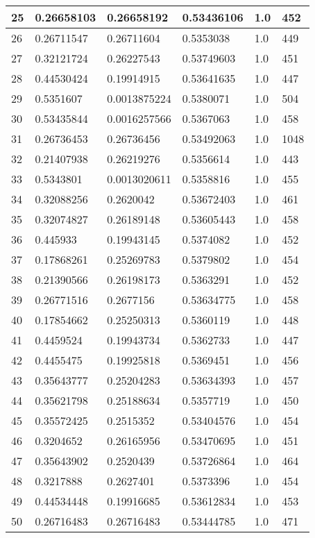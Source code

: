 \begin{longtable}{|l|l|l|l|l|l|}
25 & 0.26658103 & 0.26658192 & 0.53436106 & 1.0 & 452 \\ \hline 
26 & 0.26711547 & 0.26711604 & 0.5353038 & 1.0 & 449 \\ \hline 
27 & 0.32121724 & 0.26227543 & 0.53749603 & 1.0 & 451 \\ \hline 
28 & 0.44530424 & 0.19914915 & 0.53641635 & 1.0 & 447 \\ \hline 
29 & 0.5351607 & 0.0013875224 & 0.5380071 & 1.0 & 504 \\ \hline 
30 & 0.53435844 & 0.0016257566 & 0.5367063 & 1.0 & 458 \\ \hline 
31 & 0.26736453 & 0.26736456 & 0.53492063 & 1.0 & 1048 \\ \hline 
32 & 0.21407938 & 0.26219276 & 0.5356614 & 1.0 & 443 \\ \hline 
33 & 0.5343801 & 0.0013020611 & 0.5358816 & 1.0 & 455 \\ \hline 
34 & 0.32088256 & 0.2620042 & 0.53672403 & 1.0 & 461 \\ \hline 
35 & 0.32074827 & 0.26189148 & 0.53605443 & 1.0 & 458 \\ \hline 
36 & 0.445933 & 0.19943145 & 0.5374082 & 1.0 & 452 \\ \hline 
37 & 0.17868261 & 0.25269783 & 0.5379802 & 1.0 & 454 \\ \hline 
38 & 0.21390566 & 0.26198173 & 0.5363291 & 1.0 & 452 \\ \hline 
39 & 0.26771516 & 0.2677156 & 0.53634775 & 1.0 & 458 \\ \hline 
40 & 0.17854662 & 0.25250313 & 0.5360119 & 1.0 & 448 \\ \hline 
41 & 0.4459524 & 0.19943734 & 0.5362733 & 1.0 & 447 \\ \hline 
42 & 0.4455475 & 0.19925818 & 0.5369451 & 1.0 & 456 \\ \hline 
43 & 0.35643777 & 0.25204283 & 0.53634393 & 1.0 & 457 \\ \hline 
44 & 0.35621798 & 0.25188634 & 0.5357719 & 1.0 & 450 \\ \hline 
45 & 0.35572425 & 0.2515352 & 0.53404576 & 1.0 & 454 \\ \hline 
46 & 0.3204652 & 0.26165956 & 0.53470695 & 1.0 & 451 \\ \hline 
47 & 0.35643902 & 0.2520439 & 0.53726864 & 1.0 & 464 \\ \hline 
48 & 0.3217888 & 0.2627401 & 0.5373396 & 1.0 & 454 \\ \hline 
49 & 0.44534448 & 0.19916685 & 0.53612834 & 1.0 & 453 \\ \hline 
50 & 0.26716483 & 0.26716483 & 0.53444785 & 1.0 & 471 \\ \hline 
\end{longtable}